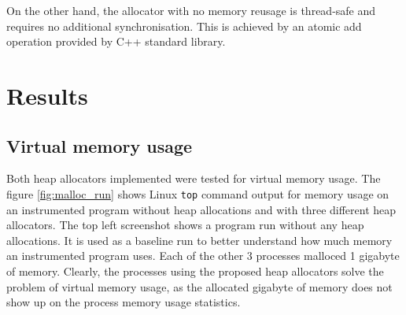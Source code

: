\documentclass[bsc,frontabs,twoside,singlespacing,parskip,deptreport]{infthesis}     %
\begin{document}
On the other hand, the allocator with no memory reusage is thread-safe and requires no additional synchronisation. This is achieved by an atomic add operation provided by C++ standard library.

\section{Results}

\subsection{Virtual memory usage}

Both heap allocators implemented were tested for virtual memory usage. The figure \ref{fig:malloc_run} shows Linux \texttt{top} command output for memory usage on an instrumented program without heap allocations and with three different heap allocators. The top left screenshot shows a program run without any heap allocations. It is used as a baseline run to better understand how much memory an instrumented program uses. Each of the other 3 processes malloced 1 gigabyte of memory. Clearly, the processes using the proposed heap allocators solve the problem of virtual memory usage, as the allocated gigabyte of memory does not show up on the process memory usage statistics.
\end{document}
